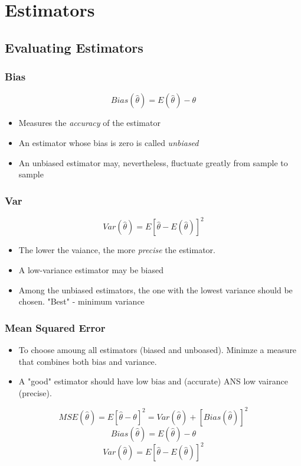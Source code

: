 \documentclass[12pt]{article}
\begin{document}
\section*{Estimators \cite{classnotes.18}}

\subsection*{Evaluating Estimators}
\subsubsection*{Bias}
$$Bias(\hat{\theta})=E(\hat{\theta})-\theta$$

\begin{itemize}
\item Measures the \emph{accuracy} of the estimator
\item An estimator whose bias is zero is called \emph{unbiased}
\item An unbiased estimator may, nevertheless, fluctuate greatly from sample to sample
\end{itemize}

\subsubsection*{Var}
$$Var(\hat{\theta})=E{[\hat{\theta}-E(\hat{\theta})]^2}$$

\begin{itemize}
\item The lower the vaiance, the more \emph{precise} the estimator.
\item A low-variance estimator may be biased
\item Among the unbiased estimators, the one with the lowest variance should be chosen. "Best" - minimum variance
\end{itemize}

\subsubsection*{Mean Squared Error}
\begin{itemize}
\item To choose amoung all estimators (biased and unboased). Minimze a measure that combines both bias and variance.
\item A "good" estimator should have low bias and (accurate) ANS low vairance (precise).
\end{itemize}
$$MSE(\hat{\theta})=E{[\hat{\theta}-\theta]^2}=Var(\hat{\theta})+[Bias(\hat{\theta})]^2$$
$$Bias(\hat{\theta})=E(\hat{\theta})-\theta$$
$$Var(\hat{\theta})=E{[\hat{\theta}-E(\hat{\theta})]^2}$$

\newpage


\end{document}
